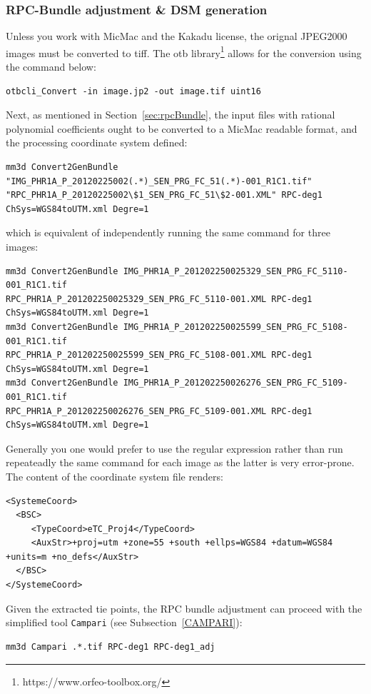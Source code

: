 \subsubsection*{RPC-Bundle adjustment \& DSM generation}
%
Unless you work with MicMac and the Kakadu license, the orignal JPEG2000 images must be  converted to tiff. The otb library\footnote{https://www.orfeo-toolbox.org/} allows for the conversion using the command below: 
\begin{verbatim}
otbcli_Convert -in image.jp2 -out image.tif uint16
\end{verbatim}
%
%
Next, as mentioned in Section~\ref{sec:rpcBundle}, the input files with rational polynomial coefficients ought to be converted to a MicMac readable format, and the processing coordinate system defined:
\begin{verbatim}
mm3d Convert2GenBundle "IMG_PHR1A_P_20120225002(.*)_SEN_PRG_FC_51(.*)-001_R1C1.tif"
"RPC_PHR1A_P_20120225002\$1_SEN_PRG_FC_51\$2-001.XML" RPC-deg1 ChSys=WGS84toUTM.xml Degre=1
\end{verbatim}
%
which is equivalent of independently running the same command for three images:
%
\begin{verbatim} 
mm3d Convert2GenBundle IMG_PHR1A_P_201202250025329_SEN_PRG_FC_5110-001_R1C1.tif
RPC_PHR1A_P_201202250025329_SEN_PRG_FC_5110-001.XML RPC-deg1 ChSys=WGS84toUTM.xml Degre=1
mm3d Convert2GenBundle IMG_PHR1A_P_201202250025599_SEN_PRG_FC_5108-001_R1C1.tif
RPC_PHR1A_P_201202250025599_SEN_PRG_FC_5108-001.XML RPC-deg1 ChSys=WGS84toUTM.xml Degre=1
mm3d Convert2GenBundle IMG_PHR1A_P_201202250026276_SEN_PRG_FC_5109-001_R1C1.tif
RPC_PHR1A_P_201202250026276_SEN_PRG_FC_5109-001.XML RPC-deg1 ChSys=WGS84toUTM.xml Degre=1
\end{verbatim}
%
\label{Ex:Proj4:Sat}
Generally you one would prefer to use the regular expression rather than run repeateadly the same command for each image as the latter is very error-prone. The content of the coordinate system file renders:
\begin{verbatim}
<SystemeCoord>
  <BSC>
     <TypeCoord>eTC_Proj4</TypeCoord>
     <AuxStr>+proj=utm +zone=55 +south +ellps=WGS84 +datum=WGS84 +units=m +no_defs</AuxStr>
  </BSC>
</SystemeCoord> 
\end{verbatim}
%
Given the extracted tie points, the RPC bundle adjustment can proceed with the simplified tool {\tt Campari} (see Subsection~\ref{CAMPARI}):
\begin{verbatim}
mm3d Campari .*.tif RPC-deg1 RPC-deg1_adj
\end{verbatim}
